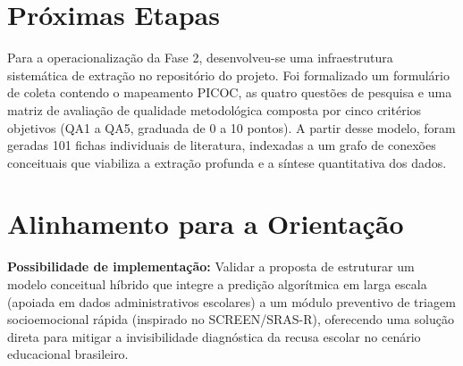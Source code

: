 \documentclass[10pt,a4paper]{article}
\begin{document}
\section{Próximas Etapas}
Para a operacionalização da Fase 2, desenvolveu-se uma infraestrutura sistemática de extração no repositório do projeto. Foi formalizado um formulário de coleta contendo o mapeamento PICOC, as quatro questões de pesquisa e uma matriz de avaliação de qualidade metodológica composta por cinco critérios objetivos (QA1 a QA5, graduada de 0 a 10 pontos). A partir desse modelo, foram geradas 101 fichas individuais de literatura, indexadas a um grafo de conexões conceituais que viabiliza a extração profunda e a síntese quantitativa dos dados.

\section{Alinhamento para a Orientação}

\textbf{Possibilidade de implementação:} Validar a proposta de estruturar um modelo conceitual híbrido que integre a predição algorítmica em larga escala (apoiada em dados administrativos escolares) a um módulo preventivo de triagem socioemocional rápida (inspirado no SCREEN/SRAS-R), oferecendo uma solução direta para mitigar a invisibilidade diagnóstica da recusa escolar no cenário educacional brasileiro.
\end{document}
